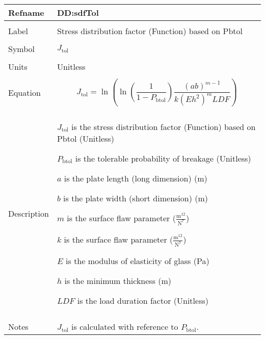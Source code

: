 \documentclass[12pt]{article}
\begin{document}
\vspace{\baselineskip}
\noindent
\begin{minipage}{\textwidth}
\begin{tabular}{>{\raggedright}p{}>{\raggedright\arraybackslash}p{}}
\toprule \textbf{Refname} & \textbf{DD:sdfTol}
\label{DD:sdfTol}
\\ \midrule \\
Label & Stress distribution factor (Function) based on Pbtol
        
\\ \midrule \\
Symbol & ${J_{\text{tol}}}$
         
\\ \midrule \\
Units & Unitless
        
\\ \midrule \\
Equation & \begin{displaymath}
           {J_{\text{tol}}}=\ln\left(\ln\left(\frac{1}{1-{P_{\text{b}\text{tol}}}}\right) \frac{\left(a b\right)^{m-1}}{k \left(E h^{2}\right)^{m} LDF}\right)
           \end{displaymath}
\\ \midrule \\
Description & \begin{symbDescription}
              \item{${J_{\text{tol}}}$ is the stress distribution factor (Function) based on Pbtol (Unitless)}
              \item{${P_{\text{b}\text{tol}}}$ is the tolerable probability of breakage (Unitless)}
              \item{$a$ is the plate length (long dimension) (m)}
              \item{$b$ is the plate width (short dimension) (m)}
              \item{$m$ is the surface flaw parameter ($\frac{\text{m}^{12}}{\text{N}^{7}}$)}
              \item{$k$ is the surface flaw parameter ($\frac{\text{m}^{12}}{\text{N}^{7}}$)}
              \item{$E$ is the modulus of elasticity of glass (Pa)}
              \item{$h$ is the minimum thickness (m)}
              \item{$LDF$ is the load duration factor (Unitless)}
              \end{symbDescription}
\\ \midrule \\
Notes & ${J_{\text{tol}}}$  is calculated with reference to  ${P_{\text{b}\text{tol}}}$.
        

\end{tabular}
\end{minipage}
\end{document}
